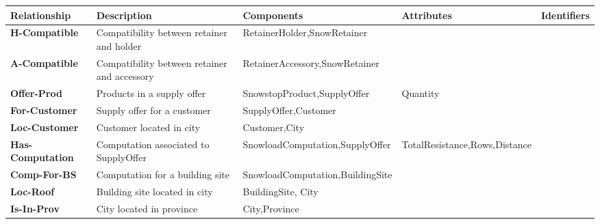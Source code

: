 \documentclass{article}[h]
\begin{document}
\begin{table}[H]
  \def\arraystretch{1.25}%
  \centering
  \begin{tabular}{ | m{3cm} | m{2.5cm}| m{3.5cm} | m{2.5cm} | m{2cm} |}  
    \hline
    {\textbf{\large Relationship}} & {\textbf{\large Description}} & {\textbf{\large Components}} & {\textbf{\large Attributes}} & {\textbf{\large Identifiers}} \\ 
    \hline
    \color[HTML]{3531FF} \textbf{H-Compatible} & Compatibility between retainer and holder & RetainerHolder,\newline SnowRetainer & & \\ 
    \hline
    \color[HTML]{3531FF} \textbf{A-Compatible} & Compatibility between retainer and accessory & RetainerAccessory,\newline SnowRetainer & & \\ 
    \hline
    \color[HTML]{3531FF} \textbf{Offer-Prod} & Products in a supply offer & SnowstopProduct,\newline SupplyOffer & Quantity  &  \\ 
    \hline
    \color[HTML]{3531FF} \textbf{For-Customer} & Supply offer for a customer & SupplyOffer,\newline Customer &  &  \\ 
    \hline
    \color[HTML]{3531FF} \textbf{Loc-Customer} & Customer located in city & Customer,\newline City &  &  \\ 
    \hline
    \color[HTML]{3531FF} \textbf{Has-Computation} & Computation associated to SupplyOffer & SnowloadComputation,\newline SupplyOffer & TotalResistance,\newline Rows,\newline Distance &  \\ 
    \hline
    \color[HTML]{3531FF} \textbf{Comp-For-BS} & Computation for a building site & SnowloadComputation,\newline BuildingSite & &  \\ 
    \hline
    \color[HTML]{3531FF} \textbf{Loc-Roof} & Building site located in city & BuildingSite, City &  &  \\ 
    \hline
    \color[HTML]{3531FF} \textbf{Is-In-Prov} & City located in province & City,\newline Province &  &  \\ 
    \hline
  \end{tabular}
\end{table}
\end{document}
